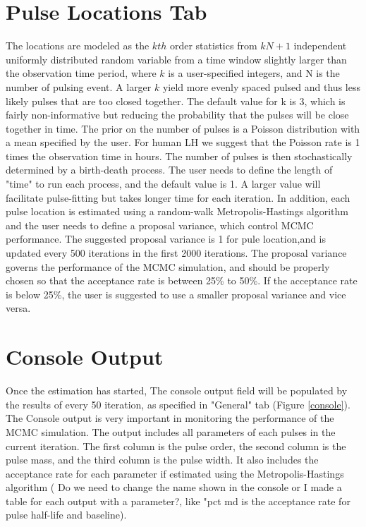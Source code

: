 \documentclass[11pt]{book}
\begin{document}
\section{Pulse Locations Tab}
The locations are modeled as the $kth$ order statistics from $kN+1$ independent uniformly distributed random variable from a time window slightly larger than the observation time period, where $k$ is a user-specified integers, and N is the number of pulsing event. A larger $k$ yield more evenly spaced pulsed and thus less likely pulses that are too closed together. The default value for k is 3, which is fairly non-informative but reducing the probability that the pulses will be close together in time. The prior on the number of pulses is a Poisson distribution with a mean specified by the user. For human LH we suggest that the Poisson rate is 1 times the observation time in hours. The number of pulses is then stochastically determined by a birth-death process. The user needs to define the length of "time" to run each process, and the default value is 1. A larger value will facilitate pulse-fitting but takes longer time for each iteration. In addition, each pulse location is estimated using a random-walk Metropolis-Hastings algorithm and the user needs to define a proposal variance, which control MCMC performance. The suggested proposal variance  is 1 for pule location,and is updated every 500 iterations in the first 2000 iterations. The proposal variance governs the performance of the MCMC simulation, and should be properly chosen so that the acceptance rate is between 25\% to 50\%. If the acceptance rate is below 25\%, the user is suggested to use a smaller proposal variance and vice versa.


\section{Console Output}
Once the estimation has started, The console output field will be populated by the results of every 50 iteration, as specified in "General" tab (Figure \ref{console}). The Console output is very important in monitoring the performance of the MCMC simulation. The output includes all parameters of each pulses in the current iteration. The first column is the pulse order, the second column is the pulse mass, and the third column is the pulse width. It also includes the acceptance rate for each parameter if estimated using the Metropolis-Hastings algorithm ( Do we need to change the name shown in the console or I made a table for each output with a parameter?, like "pct md is the acceptance rate for pulse half-life and baseline).
\end{document}
